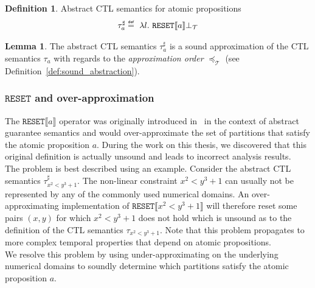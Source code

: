 \documentclass[11pt,a4paper,titlepage]{article}
\theoremstyle{definition}
\newtheorem{definition}{Definition}[section]
\newtheorem{lemma}[theorem]{Lemma}
\newcommand\eqdef{\mathrel{\overset{\makebox[0pt]{\mbox{\normalfont\tiny\sffamily def}}}{=}}}
\begin{document}
\begin{definition}\label{def:abstract_ctl_semantics_atomic}
    Abstract CTL semantics for atomic propositions
    \begin{align}
        \tau^{\sharp}_{a} \eqdef \ \lambda l. \ \mathtt{RESET} \llbracket a \rrbracket \bot_\mathcal{T}
    \end{align}
\end{definition}

\begin{lemma}
    The abstract CTL semantics $\tau^{\sharp}_{a}$ is a sound approximation of the
    CTL semantics $\tau_{a}$ with regards to the \textit{approximation order} $\preceq_\mathcal{T}$ (see Definition~\ref{def:sound_abstraction}).
\end{lemma}


\begin{tcolorbox}
    \subsubsection*{$\mathtt{RESET}$ and over-approximation}

    The $\mathtt{RESET}\llbracket a \rrbracket$ operator was originally introduced in~\cite{UrbanPhd} in the context of abstract guarantee semantics
    and would over-approximate the set of partitions that satisfy the atomic proposition $a$. 
    During the work on this thesis, we discovered that this original definition is actually unsound and leads to incorrect analysis results.\\
    
    The problem is best described using an example. Consider the abstract CTL semantics $\tau^{\sharp}_{x^2 < y^3 + 1}$. 
    The non-linear constraint $x^2 < y^3 + 1$ can usually not be represented by any of the commonly used numerical domains. 
    An over-approximating implementation of $\mathtt{RESET}\llbracket x^2 < y^3 + 1 \rrbracket$ will therefore
    reset some pairs $(x, y)$ for which $x^2 < y^3 + 1$ does not hold which is unsound as to the definition of
    the CTL semantics $\tau_{x^2 < y^3 + 1}$. Note that this problem propagates to more complex temporal properties that
    depend on atomic propositions.\\

    We resolve this problem by using under-approximating on the underlying numerical domains to soundly determine which partitions 
    satisfy the atomic proposition $a$. 
\end{tcolorbox}
\end{document}
